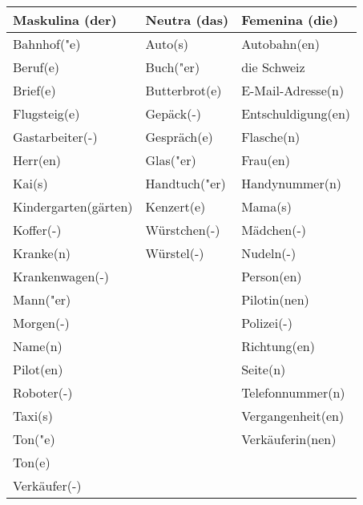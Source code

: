\documentclass{article}
\renewcommand{\arraystretch}{1}
\begin{document}
\begin{table}[h!]
    \centering
    \label{tab:tabla1}
    \renewcommand{\arraystretch}{1.5}
    \begin{tabular}{|>{\raggedright\arraybackslash}p{5cm}|>{\raggedright\arraybackslash}p{5cm}|>{\raggedright\arraybackslash}p{5cm}|}
        \hline
        \rowcolor{gray!20} \textbf{Maskulina (der)} & \textbf{Neutra (das)} & \textbf{Femenina (die)} \\
        \hline
        Bahnhof("e) & Auto(s) & Autobahn(en) \\\hline
        Beruf(e) & Buch("er) & die Schweiz \\\hline
        Brief(e) & Butterbrot(e) & E-Mail-Adresse(n) \\\hline
        Flugsteig(e) & Gepäck(-) & Entschuldigung(en) \\\hline
        Gastarbeiter(-) & Gespräch(e) & Flasche(n) \\\hline
        Herr(en) & Glas("er) & Frau(en) \\\hline
        Kai(s) & Handtuch("er) & Handynummer(n) \\\hline
        Kindergarten(gärten) & Kenzert(e) & Mama(s) \\\hline
        Koffer(-) & Würstchen(-) & Mädchen(-) \\\hline
        Kranke(n) & Würstel(-) & Nudeln(-) \\\hline
        Krankenwagen(-) &  & Person(en) \\\hline
        Mann("er) &  & Pilotin(nen) \\\hline
        Morgen(-) &  & Polizei(-) \\\hline
        Name(n) &  & Richtung(en) \\\hline
        Pilot(en) &  & Seite(n) \\\hline
        Roboter(-) &  & Telefonnummer(n) \\\hline
        Taxi(s) &  & Vergangenheit(en) \\\hline
        Ton("e) &  & Verkäuferin(nen) \\\hline
        Ton(e) &  &  \\\hline
        Verkäufer(-) &  &  \\\hline
    \end{tabular}
\end{table}
\end{document}
